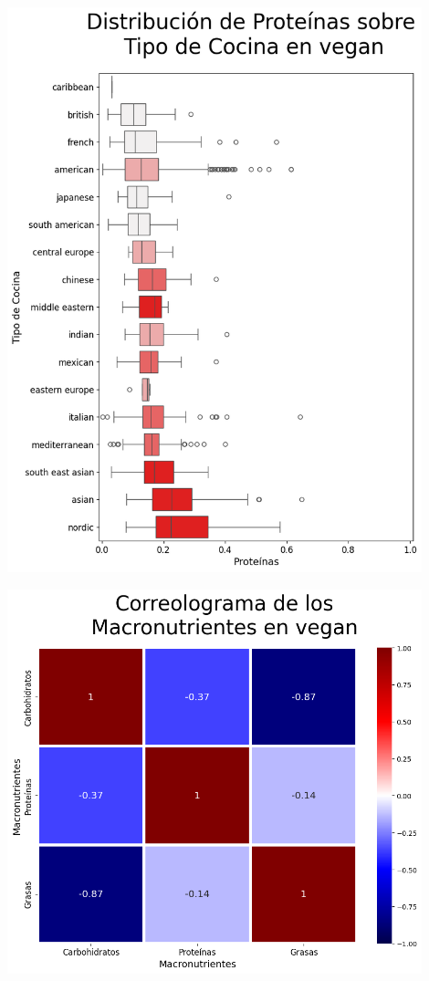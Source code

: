 \documentclass[12pt,a4paper]{article}
\begin{document}
            \begin{center}
                \includegraphics[width=0.90\textwidth]{Resources/2_03_plot_05_2.png}
            \end{center}

            \begin{center}
                \includegraphics[width=0.90\textwidth]{Resources/2_03_plot_05_4.png}
            \end{center}
\end{document}
